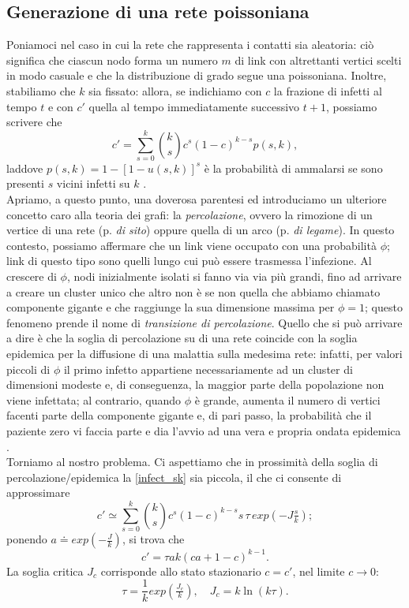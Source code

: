 \subsection{Generazione di una rete poissoniana}
Poniamoci nel caso in cui la rete che rappresenta i contatti sia aleatoria: ciò significa che ciascun nodo forma un numero $ m $ di link con altrettanti vertici scelti in modo casuale e che la distribuzione di grado segue una poissoniana. Inoltre, stabiliamo che $ k $ sia fissato: allora, se indichiamo con $ c $ la frazione di infetti al tempo $ t $ e con $ c' $ quella al tempo immediatamente successivo $ t + 1 $, possiamo scrivere che
\begin{equation}
c' = \sum_{s = 0}^k \binom{k}{s}c^s \left(1-c \right)^{k-s} p\left(s,k \right),
\end{equation}
laddove $ p\left(s,k \right) = 1 - \left[1 - u \left(s,k \right) \right]^s$ è la probabilità di ammalarsi se sono presenti $ s $ vicini infetti su $ k $ \cite{Bagnoli2014}. 
\medskip
\\Apriamo, a questo punto, una doverosa parentesi ed introduciamo un ulteriore concetto caro alla teoria dei grafi: la \emph{percolazione}, ovvero la rimozione di un vertice di una rete (p. \emph{di sito}) oppure quella di un arco (p. \emph{di legame}). In questo contesto, possiamo affermare che un link viene occupato con una probabilità $ \phi $; link di questo tipo sono quelli lungo cui può essere trasmessa l'infezione. Al crescere di  $ \phi $, nodi inizialmente isolati si fanno via via più grandi, fino ad arrivare a creare un cluster unico  che altro non è se non quella che abbiamo chiamato componente gigante e che raggiunge la sua dimensione massima per $ \phi = 1 $; questo fenomeno prende il nome di \emph{transizione di percolazione}. Quello che si può arrivare a dire è che la soglia di percolazione su di una rete coincide con la soglia epidemica per la diffusione di una malattia sulla medesima rete: infatti, per valori piccoli di $ \phi $ il primo infetto appartiene necessariamente ad un cluster di dimensioni modeste e, di conseguenza, la maggior parte della popolazione non viene infettata; al contrario, quando $ \phi $ è grande, aumenta il numero di vertici facenti parte della componente gigante e, di pari passo, la probabilità che il paziente zero vi faccia parte e dia l'avvio ad una vera e propria ondata epidemica \cite{Newman}.
\medskip
\\Torniamo al nostro problema. Ci aspettiamo che in prossimità della soglia di percolazione/epidemica la \eqref{infect_sk} sia piccola, il che ci consente di approssimare
\begin{equation}
	c' \simeq \sum_{s = 0}^k \binom{k}{s}c^s \left(1-c \right)^{k-s} s \, \tau \, exp(-J \tfrac{s}{k});
\end{equation}
ponendo $ a \doteq exp(- \tfrac{J}{k}) $, si trova che
\begin{equation}
	c' = \tau a k \left(c a + 1 - c \right)^{k-1}.
\end{equation}
La soglia critica $ J_c $ corrisponde allo stato stazionario $ c = c' $, nel limite $ c \rightarrow 0 $:
\begin{equation}
	\tau = \frac{1}{k} exp(\tfrac{J_c}{k}),\quad J_c = k \ln(k \tau).
\end{equation}

